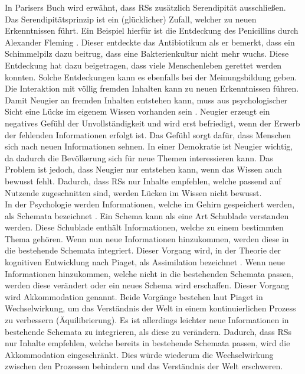 In Parisers Buch wird erwähnt, dass \acp{RS} zusätzlich Serendipität ausschließen.
Das Serendipitätsprinzip ist ein (glücklicher) Zufall, welcher zu neuen Erkenntnissen führt.
Ein Beispiel hierfür ist die Entdeckung des Penicillins durch Alexander Fleming \cite{penicilin}.
Dieser entdeckte das Antibiotikum als er bemerkt, dass ein Schimmelpilz dazu beitrug, dass eine Bakterienkultur nicht mehr wuchs.
Diese Entdeckung hat dazu beigetragen, dass viele Menschenleben gerettet werden konnten.
Solche Entdeckungen kann es ebenfalls bei der Meinungsbildung geben.
Die Interaktion mit völlig fremden Inhalten kann zu neuen Erkenntnissen führen. \\

Damit Neugier an fremden Inhalten entstehen kann, muss aus psychologischer Sicht eine Lücke im eigenem Wissen vorhanden sein \cite{handbook-emotion-curiosity}.
Neugier erzeugt ein negatives Gefühl der Unvollständigkeit und wird erst befriedigt, wenn der Erwerb der fehlenden Informationen erfolgt ist.
Das Gefühl sorgt dafür, dass Menschen sich nach neuen Informationen sehnen.
In einer Demokratie ist Neugier wichtig, da dadurch die Bevölkerung sich für neue Themen interessieren kann.
Das Problem ist jedoch, dass Neugier nur entstehen kann, wenn das Wissen auch bewusst fehlt.
Dadurch, dass \acp{RS} nur Inhalte empfehlen, welche passend auf Nutzende zugeschnitten sind, werden Lücken im Wissen nicht bewusst. \\

In der Psychologie werden Informationen, welche im Gehirn gespeichert werden, als Schemata bezeichnet \cite{schema}.
Ein Schema kann als eine Art Schublade verstanden werden.
Diese Schublade enthält Informationen, welche zu einem bestimmten Thema gehören.
Wenn nun neue Informationen hinzukommen, werden diese in die bestehende Schemata integriert.
Dieser Vorgang wird, in der Theorie der kognitiven Entwicklung nach Piaget, als Assimilation bezeichnet \cite{piaget}.
Wenn neue Informationen hinzukommen, welche nicht in die bestehenden Schemata passen, werden diese verändert oder ein neues Schema wird erschaffen.
Dieser Vorgang wird Akkommodation genannt.
Beide Vorgänge bestehen laut Piaget in Wechselwirkung, um das Verständnis der Welt in einem kontinuierlichen Prozess zu verbessern (Äquilibrierung).
Es ist allerdings leichter neue Informationen in bestehende Schemata zu integrieren, als diese zu verändern.
Dadurch, dass \acp{RS} nur Inhalte empfehlen, welche bereits in bestehende Schemata passen, wird die Akkommodation eingeschränkt.
Dies würde wiederum die Wechselwirkung zwischen den Prozessen behindern und das Verständnis der Welt erschweren. \\


